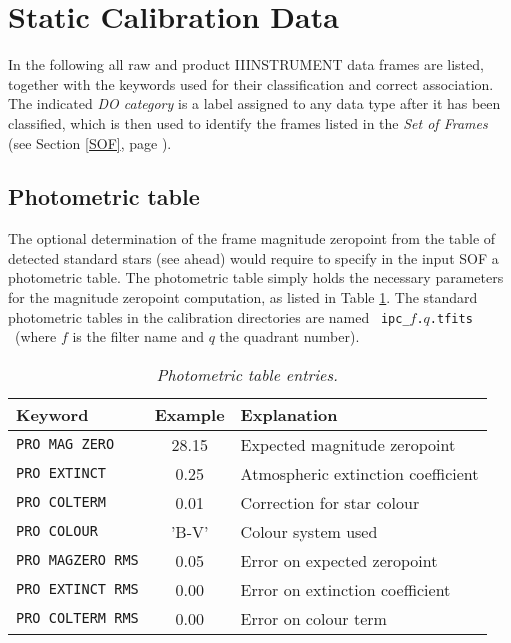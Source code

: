 \section{Static Calibration Data}
\label{CALDATA}

In the following all raw and product IIINSTRUMENT data frames are listed,
together with the keywords used for their classification and 
correct association. The indicated {\it DO category} is a 
label assigned to any data type after it has been classified,
which is then used to identify
the frames listed in the {\it Set of Frames} (see Section
\ref{SOF}, page \pageref{SOF}).

\subsection{Photometric table} 

The optional determination of the frame magnitude 
zeropoint from the table of detected standard stars (see ahead) 
would require to specify in the input SOF a photometric table.
The photometric table simply holds the necessary parameters
for the magnitude zeropoint computation, as listed in Table \ref{PHOTO}.
The standard photometric tables in the calibration directories are
named \ {\tt ipc\_}$f${\tt .}$q${\tt .tfits} \ (where $f$ is the filter
name and $q$ the quadrant number).

\begin{table}[h]
  \begin{center}
    \begin{tabular}{|l|c|l|}
    \hline
      {\bf Keyword} & {\bf Example} & {\bf Explanation} \\
    \hline
      {\tt PRO MAG ZERO} & 28.15 & Expected magnitude zeropoint  \\
      {\tt PRO EXTINCT}  &  0.25 & Atmospheric extinction coefficient  \\
      {\tt PRO COLTERM}  &  0.01 & Correction for star colour  \\
      {\tt PRO COLOUR}   & 'B-V' & Colour system used  \\
      {\tt PRO MAGZERO RMS} & 0.05 & Error on expected zeropoint  \\
      {\tt PRO EXTINCT RMS} & 0.00 & Error on extinction coefficient  \\
      {\tt PRO COLTERM RMS} & 0.00 & Error on colour term  \\
    \hline
    \end{tabular}
    \caption{\it Photometric table entries.}
    \label{PHOTO}
  \end{center}
\end{table}



